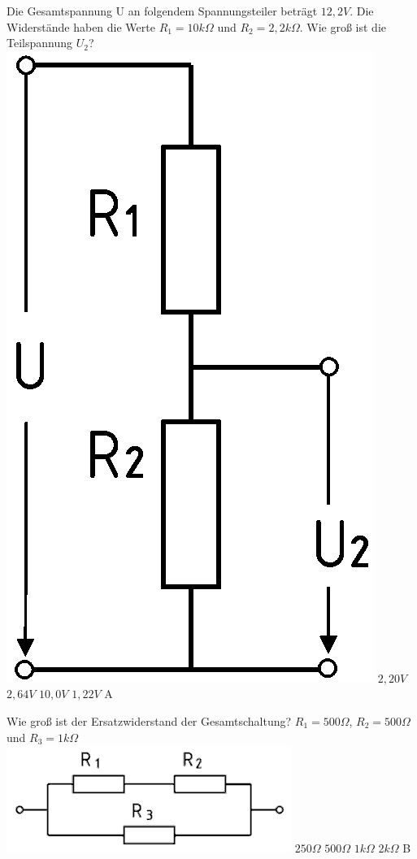 {Die Gesamtspannung U an folgendem Spannungsteiler beträgt $12,2V$. Die
Widerstände haben die Werte $R_1 = 10k\Omega$ und $R_2 = 2,2k\Omega$. Wie groß
ist die Teilspannung $U_2$?\\ \includegraphics[scale=0.15]{Spannungsteiler.png}}%
{$2,20V$}%
{$2,64V$}%
{$10,0V$}%
{$1,22V$}%
{A}%

{Wie groß ist der Ersatzwiderstand der Gesamtschaltung? 
$R_1 = 500\Omega$, $R_2 = 500\Omega$ und $R_3 = 1k\Omega$\\ \includegraphics[scale=0.4]{Parallelschaltung.png}}%
{$250\Omega$}%
{$500\Omega$}%
{$1k\Omega$}%
{$2k\Omega$}%
{B}%

